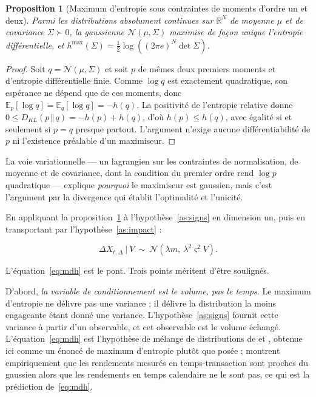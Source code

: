 \documentclass[11pt]{article}
\newtheorem{proposition}{Proposition}
\theoremstyle{definition}
\theoremstyle{remark}
\newcommand{\KL}[2]{D_{KL}\!\left(#1\,\Vert\,#2\right)}
\begin{document}
\begin{proposition}[Maximum d'entropie sous contraintes de moments d'ordre un et deux]
\label{prop:maxent}
Parmi les distributions absolument continues sur $\mathbb{R}^N$ de moyenne $\mu$
et de covariance $\Sigma\succ0$, la gaussienne $\mathcal N(\mu,\Sigma)$ maximise
de façon unique l'entropie différentielle, et
$h^{\max}(\Sigma)=\tfrac12\log\left((2\pi e)^N\det\Sigma\right)$.
\end{proposition}

\begin{proof}
Soit $q=\mathcal N(\mu,\Sigma)$ et soit $p$ de mêmes deux premiers moments et
d'entropie différentielle finie. Comme $\log q$ est exactement quadratique, son
espérance ne dépend que de ces moments, donc
$\mathbb{E}_p[\log q]=\mathbb{E}_q[\log q]=-h(q)$. La positivité de l'entropie
relative donne $0\le \KL{p}{q} = -h(p)+h(q)$, d'où $h(p)\le h(q)$, avec égalité
si et seulement si $p=q$ presque partout. L'argument n'exige aucune
différentiabilité de $p$ ni l'existence préalable d'un maximiseur.
\end{proof}

La voie variationnelle --- un lagrangien sur les contraintes de normalisation, de
moyenne et de covariance, dont la condition du premier ordre rend $\log p$
quadratique --- explique \emph{pourquoi} le maximiseur est gaussien, mais c'est
l'argument par la divergence qui établit l'optimalité et l'unicité.

En appliquant la proposition~\ref{prop:maxent} à
l'hypothèse~\ref{as:signs} en dimension un, puis en transportant par
l'hypothèse~\ref{as:impact} :

\begin{equation}
\label{eq:mdh}
\Delta X_{t,\Delta}\ \big|\ V \ \sim\ \mathcal{N}\!\left(\lambda m,\ \lambda^2\varsigma^2 V\right).
\end{equation}

L'équation~\eqref{eq:mdh} est le pont. Trois points méritent d'être soulignés.

D'abord, \emph{la variable de conditionnement est le volume, pas le temps}. Le
maximum d'entropie ne délivre pas une variance ; il délivre la distribution la
moins engageante étant donné une variance. L'hypothèse~\ref{as:signs} fournit
cette variance à partir d'un observable, et cet observable est le volume échangé.
L'équation~\eqref{eq:mdh} est l'hypothèse de mélange de distributions de
\citet{clark1973} et \citet{tauchen1983}, obtenue ici comme un énoncé de maximum
d'entropie plutôt que posée ; \citet{ane2000} montrent empiriquement que les
rendements mesurés en temps-transaction sont proches du gaussien alors que les
rendements en temps calendaire ne le sont pas, ce qui est la prédiction
de~\eqref{eq:mdh}.
\end{document}
